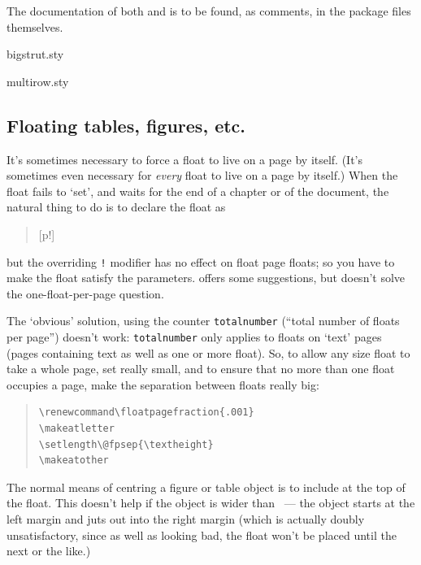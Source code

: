 The documentation of both  and  is
to be found, as comments, in the package files themselves.
\begin{ctanrefs}
\item[bigstrut.sty]
\item[multirow.sty]
\end{ctanrefs}

\subsection{Floating tables, figures, etc.}


It's sometimes necessary to force a float to live on a page by itself.
(It's sometimes even necessary for \emph{every} float to live on a
page by itself.)  When the float fails to `set', and waits for the end
of a chapter or of the document, the natural thing to do is to declare
the float as
\begin{quote}
  [p!]
\end{quote}
but the overriding \texttt{!} modifier has no effect on float page floats; so
you have to make the float satisfy the parameters.
 offers some
suggestions, but doesn't solve the one-float-per-page question.

The `obvious' solution, using the counter \texttt{totalnumber}
(``total number of floats per page'') doesn't work:
\texttt{totalnumber} only applies to floats on `text' pages (pages
containing text as well as one or more float).  So, to allow any
size float to take a whole page, set  really
small, and to ensure that no more than one float occupies a page, make
the separation between floats really big:
\begin{quote}
\begin{verbatim}
\renewcommand\floatpagefraction{.001}
\makeatletter
\setlength\@fpsep{\textheight}
\makeatother
\end{verbatim}
\end{quote}


The normal means of centring a figure or table object is to include
 at the top of the float.  This doesn't help if the
object is wider than ~--- the object starts at the left
margin and juts out into the right margin (which is actually doubly
unsatisfactory, since as well as looking bad, the float won't be
placed until the next  or the like.)

